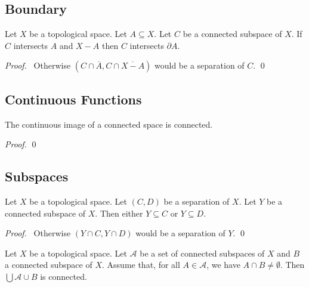\subsection{Boundary}

\begin{prop}
Let $X$ be a topological space. Let $A \subseteq X$. Let $C$ be a connected subspace of $X$. If $C$ intersects $A$ and $X - A$ then $C$ intersects $\partial A$.
\end{prop}

\begin{proof}
\pf\ Otherwise $(C \cap \overline{A}, C \cap \overline{X - A})$ would be a separation of $C$. \qed
\end{proof}

\subsection{Continuous Functions}

\begin{prop}
\label{prop:continuous_image_of_connected}
The continuous image of a connected space is connected.
\end{prop}

\begin{proof}
\pf
{}
\qed
\end{proof}

\subsection{Subspaces}

\begin{prop}
\label{prop:connected_subspace}
Let $X$ be a topological space. Let $(C,D)$ be a separation of $X$. Let $Y$ be a connected subspace of $X$. Then either $Y \subseteq C$ or $Y \subseteq D$.
\end{prop}

\begin{proof}
\pf\ Otherwise $(Y \cap C, Y \cap D)$ would be a separation of $Y$. \qed
\end{proof}

\begin{prop}
\label{prop:connected_union}
Let $X$ be a topological space. Let $\mathcal{A}$ be a set of connected subspaces of $X$ and $B$ a connected subspace of $X$. Assume that, for all $A \in \mathcal{A}$, we have $A \cap B \neq \emptyset$. Then $\bigcup \mathcal{A} \cup B$ is connected.
\end{prop}

